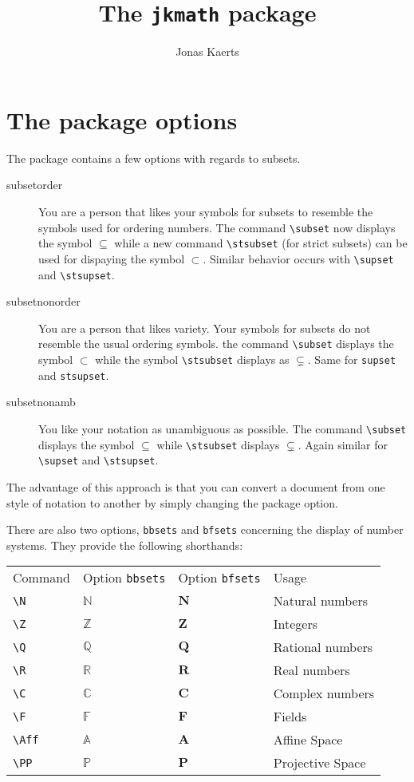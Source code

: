 \documentclass[12pt,a4paper]{article}
\author{Jonas Kaerts}
\title{The \texttt{jkmath} package}
\begin{document}
\maketitle

\section{The package options}
The package contains a few options with regards to subsets.
\begin{description}
    \item[subsetorder] You are a person that likes your symbols for subsets to resemble the symbols used for ordering numbers.
    The command \verb|\subset| now displays the symbol $\subseteq$ while a new command \verb|\stsubset| (for strict subsets) can be used for dispaying the symbol $\subset$.
    Similar behavior occurs with \verb|\supset| and \verb|\stsupset|.
    \item[subsetnonorder] You are a person that likes variety.
    Your symbols for subsets do not resemble the usual ordering symbols.
    the command \verb|\subset| displays the symbol $\subset$ while the symbol \verb|\stsubset| displays as $\subsetneq$.
    Same for \verb|supset| and \verb|stsupset|.
    \item[subsetnonamb] You like your notation as unambiguous as possible.
    The command \verb|\subset| displays the symbol $\subseteq$ while \verb|\stsubset| displays $\subsetneq$.
    Again similar for \verb|\supset| and \verb|\stsupset|.
\end{description}
The advantage of this approach is that you can convert a document from one style of notation to another by simply changing the package option.

There are also two options, \verb|bbsets| and \verb|bfsets| concerning the display of number systems.
They provide the following shorthands:

\begin{tabular}{llll}
    Command & Option \verb|bbsets|& Option \verb|bfsets| & Usage\\
    \verb|\N| & $\mathbb{N}$ & $\mathbf{N}$ & Natural numbers\\
    \verb|\Z| & $\mathbb{Z}$ & $\mathbf{Z}$ & Integers\\
    \verb|\Q| & $\mathbb{Q}$ & $\mathbf{Q}$ & Rational numbers\\
    \verb|\R| & $\mathbb{R}$ & $\mathbf{R}$ & Real numbers\\
    \verb|\C| & $\mathbb{C}$ & $\mathbf{C}$ & Complex numbers\\
    \verb|\F| & $\mathbb{F}$ & $\mathbf{F}$ & Fields\\
    \verb|\Aff| & $\mathbb{A}$ & $\mathbf{A}$ & Affine Space\\
    \verb|\PP| & $\mathbb{P}$ & $\mathbf{P}$ & Projective Space\\
\end{tabular}
\end{document}
